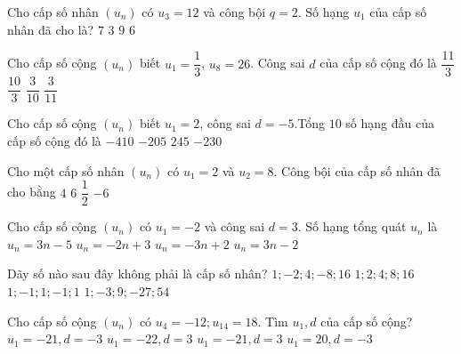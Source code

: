 \begin{ex}
Cho cấp số nhân $(u_n)$ có $u_3=12$ và công bội $q=2$. Số hạng $u_1$ của cấp số nhân đã cho là?
\choice
{$7$}
{\True $3$}
{$9$}
{$6$}
\end{ex}
\begin{ex}
Cho cấp số cộng $(u_n)$ biết $u_1=\dfrac{1}{3}$, $u_8=26$. Công sai $d$ của cấp số cộng đó là 
\choice
{\True $\dfrac{11}{3}$}
{$\dfrac{10}{3}$}
{$\dfrac{3}{10}$}
{$\dfrac{3}{11}$}
\end{ex}
\begin{ex}
Cho cấp số cộng $(u_n)$ biết $u_1=2$, công sai $d=-5$.Tổng $10$ số hạng đầu của cấp số cộng đó là
\choice
{$-410$}
{\True $-205$}
{$245$}
{$-230$}
\end{ex}
\begin{ex}
Cho một cấp số nhân $(u_n)$ có $u_1=2$ và $u_2=8$. Công bội của cấp số nhân đã cho bằng
\choice
{\True $4$}
{$6$}
{$\dfrac{1}{2}$}
{$-6$}
\end{ex}
\begin{ex}
Cho cấp số cộng $(u_n)$ có $u_1=-2$ và công sai $d=3$. Số hạng tổng quát $u_n$ là
\choice
{$u_n=3n-5$}
{$u_n=-2n+3$}
{$u_n=-3n+2$}
{$u_n=3n-2$}
\end{ex}
\begin{ex}
Dãy số nào sau đây không phải là cấp số nhân?
\choice
{$1;-2;4;-8;16$}
{$1;2;4;8;16$}
{$1;-1;1;-1;1$}
{\True $1;-3;9;-27;54$}
\loigiai{
}
\end{ex}
\begin{ex}
Cho cấp số cộng $(u_n)$ có $u_4=-12;u_{14}=18$. Tìm $u_1,d$ của cấp số cộng?
\choice
{$u_1=-21,d=-3$}
{$u_1=-22,d=3$}
{\True $u_1=-21,d=3$}
{$u_1=20,d=-3$}
\end{ex}
